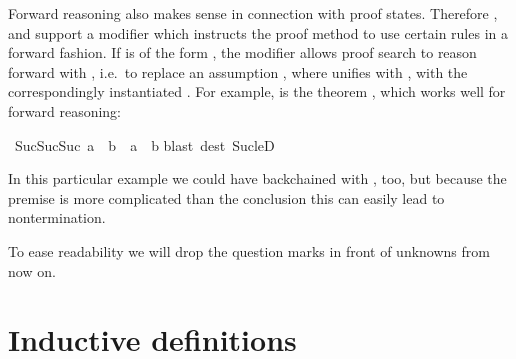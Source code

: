 \begin{isabellebody}
\begin{isamarkuptext}
Forward reasoning also makes sense in connection with proof states.
Therefore ,  and  support a modifier
 which instructs the proof method to use certain rules in a
forward fashion. If  is of the form \mbox{}, the modifier
\mbox{}
allows proof search to reason forward with , i.e.\
to replace an assumption , where  unifies with ,
with the correspondingly instantiated \isa{B}. For example, \isa{Suc{\isaliteral{5F}{\isacharunderscore}}leD} is the theorem \mbox{}, which works well for forward reasoning:%
\end{isamarkuptext}%
\isamarkuptrue%
\isamarkupfalse%
\ {}Suc{}Suc{}Suc\ a{}{}\ {}\ b\ {}\ a\ {}\ b{}\isanewline
%
\isadelimproof
%
\endisadelimproof
%
\isatagproof
{}\isamarkupfalse%
{}blast\ dest{}\ Suc{}leD{}%
\endisatagproof
{\isafoldproof}%
%
\isadelimproof
%
\endisadelimproof
%
\begin{isamarkuptext}%
In this particular example we could have backchained with
, too, but because the premise is more complicated than the conclusion this can easily lead to nontermination.

\begin{warn}
To ease readability we will drop the question marks
in front of unknowns from now on.
\end{warn}

\section{Inductive definitions}
\label{sec:inductive-defs}


\end{isamarkuptext}
\end{isabellebody}
